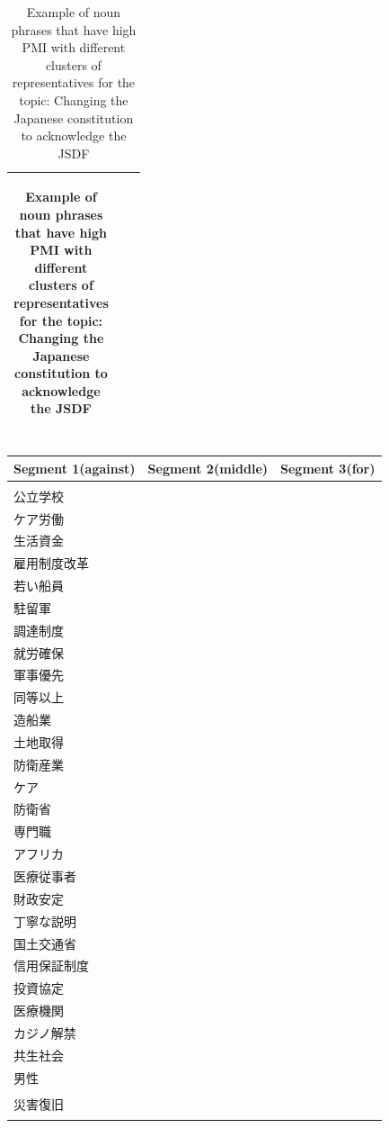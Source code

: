 \documentclass[final,5p,times,twocolumn,authoryear]{elsarticle}
\begin{document}
\begin{table}[htbp]
\begin{CJK}{UTF8}{min}
\begin{tabularx}{\textwidth}{|>{\centering\arraybackslash}X|>{\centering\arraybackslash}X|>{\centering\arraybackslash}X|}
\begin{tabular}[c]{@{}l@{}}
\end{tabular} \\ \hline
\end{tabularx}
\caption{Example of noun phrases that have high PMI with different clusters of representatives for the topic: Changing the Japanese constitution to acknowledge the JSDF}
\label{table:PMI-constitution-jp}
\end{CJK}
\end{table}

\begin{table}[htbp]
\begin{CJK}{UTF8}{min}
\centering
\renewcommand{\arraystretch}{1.5}%
\begin{tabularx}{\textwidth}{|>{\centering\arraybackslash}X|>{\centering\arraybackslash}X|>{\centering\arraybackslash}X|}
\hline
\textbf{Segment 1(against)} & \textbf{Segment 2(middle)} & \textbf{Segment 3(for)} \\ \hline
\begin{tabular}[c]{@{}l@{}}
	公共放送 \\ 公立学校 \\ ケア労働 \\ 生活資金 \\ 雇用制度改革 \\ 若い船員 \\ 駐留軍 \\ 調達制度 \\ 就労確保 \\ 軍事優先 \\ 同等以上 \\ 造船業 \\ 土地取得 \\ 防衛産業 \\ ケア \\ 防衛省 \\ 専門職 \\ アフリカ \\ 医療従事者 \\ 財政安定 \\ 丁寧な説明 \\ 国土交通省 \\ 信用保証制度 \\ 投資協定 \\ 医療機関 \\ カジノ解禁 \\ 共生社会 \\ 男性 \\ 災害復旧
\end{tabular} 
& 
\begin{tabular}[c]{@{}l@{}}

\end{tabular}
\end{tabularx}
\end{CJK}
\end{table}
\end{document}
